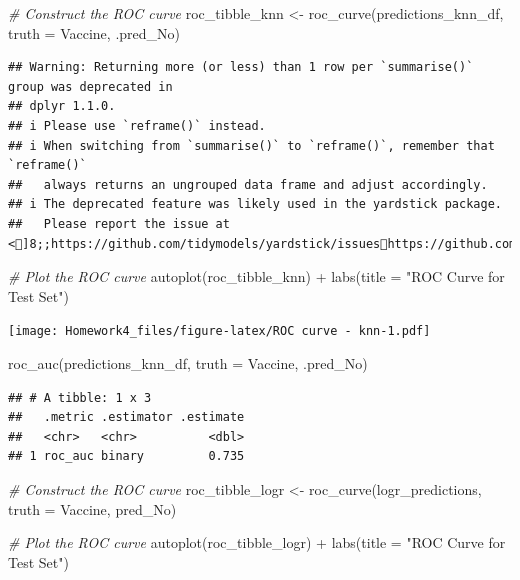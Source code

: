 \documentclass[
]{article}
\newenvironment{Shaded}{\begin{snugshade}}{\end{snugshade}}
\newcommand{\AttributeTok}[1]{\textcolor[rgb]{0.77,0.63,0.00}{#1}}
\newcommand{\CommentTok}[1]{\textcolor[rgb]{0.56,0.35,0.01}{\textit{#1}}}
\newcommand{\FunctionTok}[1]{\textcolor[rgb]{0.00,0.00,0.00}{#1}}
\newcommand{\NormalTok}[1]{#1}
\newcommand{\OtherTok}[1]{\textcolor[rgb]{0.56,0.35,0.01}{#1}}
\newcommand{\SpecialCharTok}[1]{\textcolor[rgb]{0.00,0.00,0.00}{#1}}
\newcommand{\StringTok}[1]{\textcolor[rgb]{0.31,0.60,0.02}{#1}}
\begin{document}
\begin{Shaded}
\begin{Highlighting}[]
\CommentTok{\# Construct the ROC curve}
\NormalTok{roc\_tibble\_knn }\OtherTok{\textless{}{-}} \FunctionTok{roc\_curve}\NormalTok{(predictions\_knn\_df, }\AttributeTok{truth =}\NormalTok{ Vaccine, .pred\_No)}
\end{Highlighting}
\end{Shaded}

\begin{verbatim}
## Warning: Returning more (or less) than 1 row per `summarise()` group was deprecated in
## dplyr 1.1.0.
## i Please use `reframe()` instead.
## i When switching from `summarise()` to `reframe()`, remember that `reframe()`
##   always returns an ungrouped data frame and adjust accordingly.
## i The deprecated feature was likely used in the yardstick package.
##   Please report the issue at <]8;;https://github.com/tidymodels/yardstick/issueshttps://github.com/tidymodels/yardstick/issues]8;;>.
\end{verbatim}

\begin{Shaded}
\begin{Highlighting}[]
\CommentTok{\# Plot the ROC curve}
\FunctionTok{autoplot}\NormalTok{(roc\_tibble\_knn) }\SpecialCharTok{+} \FunctionTok{labs}\NormalTok{(}\AttributeTok{title =} \StringTok{"ROC Curve for Test Set"}\NormalTok{)}
\end{Highlighting}
\end{Shaded}

\texttt{[image: Homework4\_files/figure-latex/ROC curve - knn-1.pdf]}

\begin{Shaded}
\begin{Highlighting}[]
\FunctionTok{roc\_auc}\NormalTok{(predictions\_knn\_df, }\AttributeTok{truth =}\NormalTok{ Vaccine, .pred\_No)}
\end{Highlighting}
\end{Shaded}

\begin{verbatim}
## # A tibble: 1 x 3
##   .metric .estimator .estimate
##   <chr>   <chr>          <dbl>
## 1 roc_auc binary         0.735
\end{verbatim}

\begin{Shaded}
\begin{Highlighting}[]
\CommentTok{\# Construct the ROC curve}
\NormalTok{roc\_tibble\_logr }\OtherTok{\textless{}{-}} \FunctionTok{roc\_curve}\NormalTok{(logr\_predictions, }\AttributeTok{truth =}\NormalTok{ Vaccine, pred\_No)}

\CommentTok{\# Plot the ROC curve}
\FunctionTok{autoplot}\NormalTok{(roc\_tibble\_logr) }\SpecialCharTok{+} \FunctionTok{labs}\NormalTok{(}\AttributeTok{title =} \StringTok{"ROC Curve for Test Set"}\NormalTok{)}
\end{Highlighting}
\end{Shaded}
\end{document}
